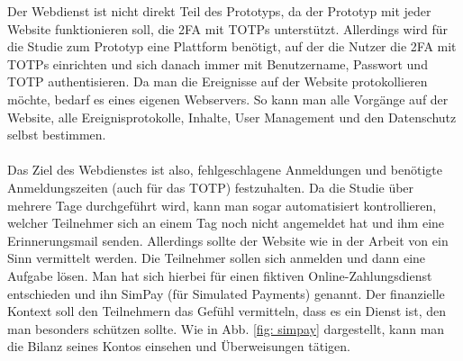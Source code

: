 Der Webdienst ist nicht direkt Teil des Prototyps, da der Prototyp mit jeder 
Website funktionieren soll, die 2FA mit TOTPs unterstützt. Allerdings wird für 
die Studie zum Prototyp eine Plattform benötigt, auf der die Nutzer die 2FA mit 
TOTPs einrichten und sich danach immer mit Benutzername, Passwort und TOTP 
authentisieren. Da man die Ereignisse auf der Website protokollieren möchte, bedarf 
es eines eigenen Webservers. So kann man alle Vorgänge auf der Website, alle 
Ereignisprotokolle, Inhalte, User Management und den Datenschutz selbst bestimmen.
\\\\
Das Ziel des Webdienstes ist also, fehlgeschlagene Anmeldungen und benötigte 
Anmeldungszeiten (auch für das TOTP) festzuhalten. Da die Studie über mehrere Tage 
durchgeführt wird, kann man sogar automatisiert kontrollieren, welcher Teilnehmer 
sich an einem Tag noch nicht angemeldet hat und ihm eine Erinnerungsmail senden. 
Allerdings sollte der Website wie in der Arbeit von \textcite{Reese} ein Sinn 
vermittelt werden. Die Teilnehmer sollen sich anmelden und dann eine Aufgabe lösen. 
Man hat sich hierbei für einen fiktiven Online-Zahlungsdienst entschieden und ihn 
\glqq SimPay\grqq{} (für Simulated Payments) genannt. Der finanzielle Kontext soll 
den Teilnehmern das Gefühl vermitteln, dass es ein Dienst ist, den man besonders 
schützen sollte. Wie in Abb. \ref{fig: simpay} dargestellt, kann man die Bilanz 
seines Kontos einsehen und Überweisungen tätigen.
